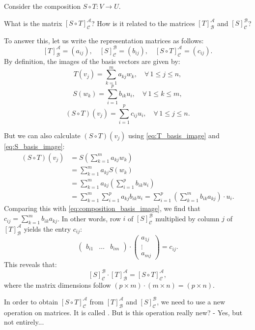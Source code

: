 Consider the composition $S \circ T: V \longrightarrow U$.

\begin{question}
What is the matrix $[S \circ T]_{\mathcal{C}}^{\mathcal{A}}$? How is it related to the matrices $[T]_{\mathcal{B}}^{\mathcal{A}}$ and $[S]_{\mathcal{C}}^{\mathcal{B}}$?
\end{question}

To answer this, let us write the representation matrices as follows:
\[
[T]_{\mathcal{B}}^{\mathcal{A}} = (a_{ij}), \quad [S]_{\mathcal{C}}^{\mathcal{B}} = (b_{ij}), \quad [S \circ T]_{\mathcal{C}}^{\mathcal{A}} = (c_{ij}).
\]
By definition, the images of the basis vectors are given by:
\begin{equation}
\label{eq:T_basis_image}
T(v_j) = \sum_{k=1}^m a_{kj} w_k, \quad \forall \, 1 \le j \le n,
\end{equation}
\begin{equation}
\label{eq:S_basis_image}
S(w_k) = \sum_{i=1}^p b_{ik} u_i, \quad \forall \, 1 \le k \le m,
\end{equation}
\begin{equation}
\label{eq:composition_basis_image}
(S \circ T)(v_j) = \sum_{i=1}^p c_{ij} u_i, \quad \forall \, 1 \le j \le n.
\end{equation}

But we can also calculate $(S \circ T)(v_j)$ using \eqref{eq:T_basis_image} and \eqref{eq:S_basis_image}:
\begin{align*}
(S \circ T)(v_j) &= S \left( \sum_{k=1}^m a_{kj} w_k \right) \\
&= \sum_{k=1}^m a_{kj} S(w_k) \\
&= \sum_{k=1}^m a_{kj} \left( \sum_{i=1}^p b_{ik} u_i \right) \\
&= \sum_{k=1}^m \sum_{i=1}^p a_{kj} b_{ik} u_i = \sum_{i=1}^p \left( \sum_{k=1}^m b_{ik} a_{kj} \right) \cdot u_i.
\end{align*}
Comparing this with \eqref{eq:composition_basis_image}, we find that $c_{ij} = \sum_{k=1}^m b_{ik} a_{kj}$. In other words, row $i$ of $[S]_{\mathcal{C}}^{\mathcal{B}}$ multiplied by column $j$ of $[T]_{\mathcal{B}}^{\mathcal{A}}$ yields the entry $c_{ij}$:
\[
\begin{pmatrix}
b_{i1} & \dots & b_{im}
\end{pmatrix}
\cdot 
\begin{pmatrix}
a_{1j} \\
\vdots \\
a_{mj}
\end{pmatrix}
= c_{ij}.
\]
This reveals that:
\[
[S]_{\mathcal{C}}^{\mathcal{B}} \cdot [T]_{\mathcal{B}}^{\mathcal{A}} = [S \circ T]_{\mathcal{C}}^{\mathcal{A}},
\]
where the matrix dimensions follow $(p \times m) \cdot (m \times n) = (p \times n)$.

In order to obtain $[S \circ T]_{\mathcal{C}}^{\mathcal{A}}$ from $[T]_{\mathcal{B}}^{\mathcal{A}}$ and $[S]_{\mathcal{C}}^{\mathcal{B}}$, we need to use a new operation on matrices. It is called . But is this operation really new?
- Yes, but not entirely...
